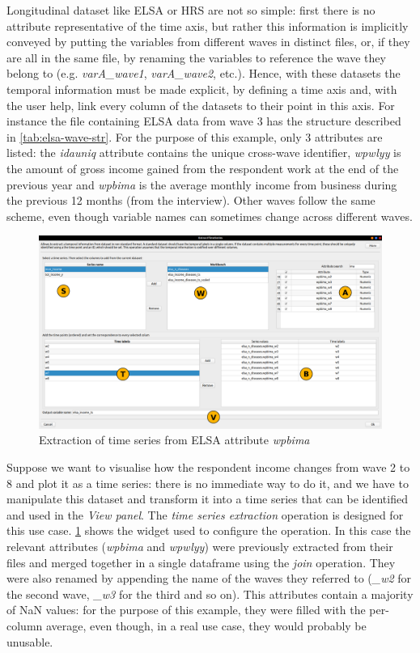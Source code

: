 Longitudinal dataset like ELSA or HRS are not so simple: first there is no attribute representative of the time axis, but rather this information is implicitly conveyed by putting the variables from different waves in distinct files, or, if they are all in the same file, by renaming the variables to reference the wave they belong to (e.g. \textit{varA\_wave1}, \textit{varA\_wave2}, etc.). Hence, with these datasets the temporal information must be made explicit, by defining a time axis and, with the user help, link every column of the datasets to their point in this axis. For instance the file containing ELSA data from wave 3 has the structure described in \cref{tab:elsa-wave-str}. For the purpose of this example, only 3 attributes are listed: the \textit{idauniq} attribute contains the unique cross-wave identifier, \textit{wpwlyy} is the amount of gross income gained from the respondent work at the end of the previous year and \textit{wpbima} is the average monthly income from business during the previous 12 months (from the interview). Other waves follow the same scheme, even though variable names can sometimes change across different waves.
\begin{figure}[!ht]
	\centering
	\includegraphics[width=\textwidth]{example_ts/extract_ts_s1}
	\caption{Extraction of time series from ELSA attribute \textit{wpbima}}
	\label{fig:elsa-extraction-wpb}
\end{figure}
Suppose we want to visualise how the respondent income changes from wave 2 to 8 and plot it as a time series: there is no immediate way to do it, and we have to manipulate this dataset and transform it into a time series that can be identified and used in the \textit{View panel}. The \textit{time series extraction} operation is designed for this use case. \cref{fig:elsa-extraction-wpb} shows the widget used to configure the operation. In this case the relevant attributes (\textit{wpbima} and \textit{wpwlyy}) were previously extracted from their files and merged together in a single dataframe using the \textit{join} operation. They were also renamed by appending the name of the waves they referred to (\textit{\_w2} for the second wave, \textit{\_w3} for the third and so on). This attributes contain a majority of NaN values: for the purpose of this example, they were filled with the per-column average, even though, in a real use case, they would probably be unusable.\\
